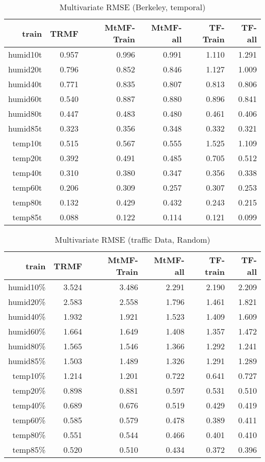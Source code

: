 \begin{table}[htbp]
\setlength{\tabcolsep}{2pt}
\centering
\caption{Multivariate RMSE (Berkeley, temporal)}
\label{table:multi_berkeley_temporal}
\begin{tabular}{r | r r r r r}
train	&TRMF	&MtMF-Train	&MtMF-all &TF-Train&TF-all \\ \hline
humid10t	&0.957&0.996& 	0.991&1.110&1.291\\
humid20t	&0.796&0.852& 	0.846&1.127&1.009\\
humid40t	&0.771&0.835& 	0.807&0.813&0.806\\
humid60t	&0.540&0.887& 	0.880&0.896&0.841\\
humid80t	&0.447&0.483& 	0.480&0.461&0.406\\
humid85t	&0.323&0.356& 	0.348&0.332&0.321\\	\hline
 temp10t	&0.515&0.567& 	0.555&1.525&1.109\\
 temp20t	&0.392&0.491& 	0.485&0.705&0.512\\
 temp40t	&0.310&0.380& 	0.347&0.356&0.338\\
 temp60t	&0.206&0.309& 	0.257&0.307&0.253\\
 temp80t	&0.132&0.429& 	0.432&0.243&0.215\\
 temp85t	&0.088&0.122& 	0.114&0.121&0.099\\
\end{tabular}
\end{table}

\begin{table}[htbp]
\setlength{\tabcolsep}{2pt}
\centering
\caption{Multivariate RMSE (traffic Data, Random)}
\label{table_multi_traffic_random}
\begin{tabular}{r | r r r r r}
train	&TRMF	&MtMF-Train	&MtMF-all &TF-train & TF-all\\ \hline
humid10\%	&3.524 	&3.486 	&2.291&2.190&2.209\\  
humid20\%	&2.583 	&2.558 	&1.796&1.461&1.821\\
humid40\%	&1.932 	&1.921 	&1.523&1.409&1.609\\
humid60\%	&1.664 	&1.649 	&1.408&1.357&1.472\\
humid80\%	&1.565 	&1.546 	&1.366&1.292&1.241\\
humid85\%	&1.503 	&1.489 	&1.326&1.291&1.289\\ \hline
 temp10\%	&1.214 	&1.201 	&0.722&0.641&0.727\\
 temp20\%	&0.898 	&0.881 	&0.597&0.531&0.510\\
 temp40\%	&0.689 	&0.676 	&0.519&0.429&0.419\\
 temp60\%	&0.585 	&0.579 	&0.478&0.389&0.411\\
 temp80\%	&0.551 	&0.544 	&0.466&0.401&0.410\\
 temp85\%	&0.520 	&0.510 	&0.434&0.372&0.396\\
\end{tabular}
\end{table}


